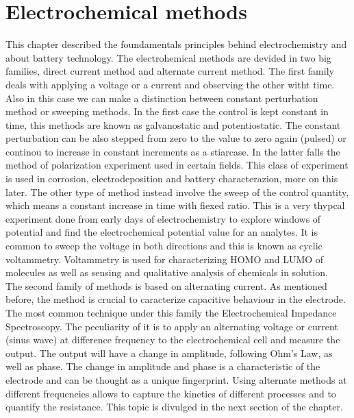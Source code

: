 \section{Electrochemical methods}
This chapter described the foundamentals principles behind electrochemistry and about battery technology. 
The electrohemical methods are devided in two big families, direct current method and alternate current method. The first family deals with applying a voltage or a current and observing the other witht time. Also in this case we can make a distinction between constant perturbation method or sweeping methods. In the first case the control is kept constant in time, this methods are known as galvanostatic and potentiostatic. The constant perturbation can be also stepped from zero to the value to zero again (pulsed) or continou to increase in constant increments as a stiarcase. In the latter falls the method of polarization experiment used in certain fields. This class of experiment is used in corrosion, electrodeposition and battery characterazion, more on this later. The other type of method instead involve the sweep of the control quantity, which means a constant increase in time with fiexed ratio. This is a very thypcal experiment done from early days of electrochemistry to explore windows of potential and find the electrochemical potential value for an analytes. It is common to sweep the voltage in both directions and this is known as cyclic voltammetry. Voltammetry is used for characterizing HOMO and LUMO of molecules as well as sensing and qualitative analysis of chemicals in solution. \\
The second family of methods is based on alternating current. As mentioned before, the method is crucial to caracterize capacitive behaviour in the electrode. The most common technique under this family the Electrochemical Impedance Spectroscopy. The peculiarity of it is to apply an alternating voltage or current (sinus wave) at difference frequency to the electrochemical cell and measure the output. The output will have a change in amplitude, following Ohm's Law, as well as phase. The change in amplitude and phase is a characteristic of the electrode and can be thought as a unique fingerprint. Using alternate methods at different frequencies allows to capture the kinetics of different processes and to quantify the resistance. This topic is divulged in the next section of the chapter.
